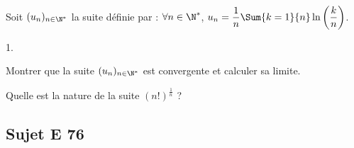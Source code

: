 \documentclass[11pt]{article}%
\begin{document}

\begin{exerciceSP}~\\
  Soit $(u_n)_{n\in\N^*}$ la suite définie par : $\forall n\in\N^*$,
  $u_n=\dfrac{1}{n}\Sum{k=1}{n} \ln\left(\dfrac{k}{n}\right)$.
  \begin{noliste}{1.}
    \setlength{\itemsep}{2mm}
  \item Montrer que la suite $(u_n)_{n\in\N^*}$ est convergente et
    calculer sa limite.
  \item Quelle est la nature de la suite $(n!)^{\frac{1}{n}}$ ?
  \end{noliste}
\end{exerciceSP}


\newpage

\subsection*{Sujet E 76}

\end{document}
